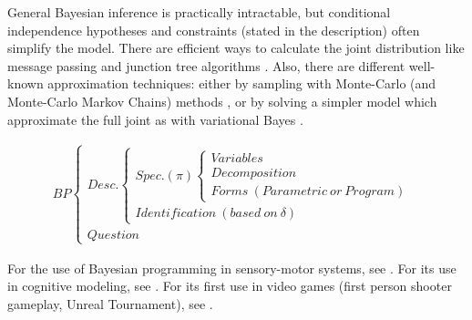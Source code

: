 General Bayesian inference is practically intractable, but conditional independence hypotheses and constraints (stated in the description) often simplify the model. There are efficient ways to calculate the joint distribution like message passing and junction tree algorithms \citep{Pearl,AjiM00,Nai04,mekhnacha,Koller}. Also, there are different well-known approximation techniques: either by sampling with Monte-Carlo (and Monte-Carlo Markov Chains) methods \citep{MacKay,Andrieu}, or by solving a simpler model which approximate the full joint as with variational Bayes \citep{Beal}.

\begin{eqnarray*}
BP
\begin{cases}
Desc.
    \begin{cases}
    Spec. (\pi)
        \begin{cases}
        Variables\\
        Decomposition\\
        Forms\ (Parametric\ or\ Program)
        \end{cases}\\
    Identification\ (based\ on\ \delta)
    \end{cases}\\
Question
\end{cases}
\end{eqnarray*}


For the use of Bayesian programming in sensory-motor systems, see \citep{PRDMSMS}. For its use in cognitive modeling, see \citep{Colas10}. For its first use in video games (first person shooter gameplay, Unreal Tournament), see \citep{LeHy04}.


